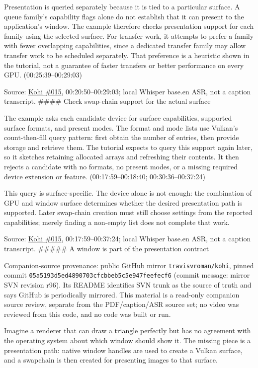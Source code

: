 Presentation is queried separately because it is tied to a particular surface. A queue family's capability flags alone do not establish that it can present to the application's window. The example therefore checks presentation support for each family using the selected surface. For transfer work, it attempts to prefer a family with fewer overlapping capabilities, since a dedicated transfer family may allow transfer work to be scheduled separately. That preference is a heuristic shown in the tutorial, not a guarantee of faster transfers or better performance on every GPU. (00:25:39--00:29:03)

Source: \href{https://www.youtube.com/watch?v=6Kj3O2Ov1RU}{Kohi \#015}, 00:20:50--00:29:03; local Whisper base.en ASR, not a caption transcript. \#\#\#\# Check swap-chain support for the actual surface

The example asks each candidate device for surface capabilities, supported surface formats, and present modes. The format and mode lists use Vulkan's count-then-fill query pattern: first obtain the number of entries, then provide storage and retrieve them. The tutorial expects to query this support again later, so it sketches retaining allocated arrays and refreshing their contents. It then rejects a candidate with no formats, no present modes, or a missing required device extension or feature. (00:17:59--00:18:40; 00:30:36--00:37:24)

This query is surface-specific. The device alone is not enough: the combination of GPU and window surface determines whether the desired presentation path is supported. Later swap-chain creation must still choose settings from the reported capabilities; merely finding a non-empty list does not complete that work.

Source: \href{https://www.youtube.com/watch?v=6Kj3O2Ov1RU}{Kohi \#015}, 00:17:59--00:37:24; local Whisper base.en ASR, not a caption transcript. \#\#\#\#\# A window is part of the presentation contract

Companion-source provenance: public GitHub mirror \texttt{travisvroman/kohi}, pinned commit \texttt{05a5193d5ed4890703cfcbbeb5c5e947feefecf6} (commit message: mirror SVN revision r96). Its README identifies SVN trunk as the source of truth and says GitHub is periodically mirrored. This material is a read-only companion source review, separate from the PDF/caption/ASR source set; no video was reviewed from this code, and no code was built or run.

Imagine a renderer that can draw a triangle perfectly but has no agreement with the operating system about which window should show it. The missing piece is a presentation path: native window handles are used to create a Vulkan surface, and a swapchain is then created for presenting images to that surface.

